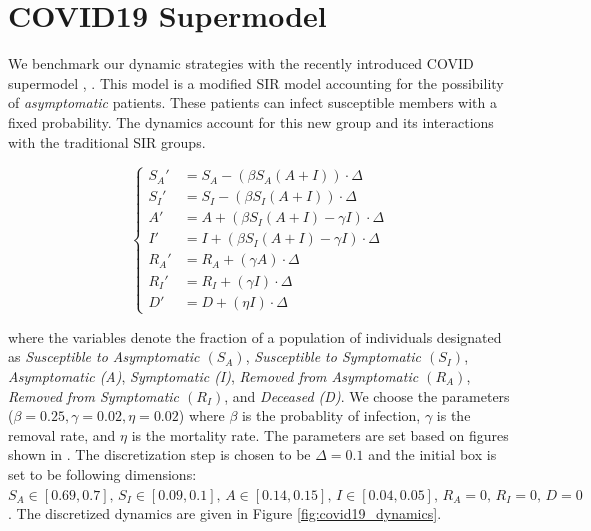 \section{COVID19 Supermodel}
\label{sec:covid}
We benchmark our dynamic strategies with the recently introduced COVID supermodel \cite{ansumali2020modelling}, \cite{indiansuper2020supermodel}. This model is a modified SIR model accounting for the possibility of \emph{asymptomatic} patients. These patients can infect susceptible members with a fixed probability. The dynamics account for this new group and its interactions with the traditional SIR groups.

\begin{center}
\begin{equation*}
  \begin{cases}
   S_A' & = S_A  -(\beta S_A(A+I))\cdot \Delta \\
   S_I' & = S_I  -(\beta S_I (A + I))\cdot \Delta \\
   A' & = A + (\beta S_I(A+I) - \gamma I)\cdot \Delta \\
   I' & = I + (\beta S_I (A+I) - \gamma I)\cdot  \Delta \\
   R_A' & = R_A + (\gamma A)\cdot \Delta \\
   R_I' & = R_I + (\gamma I)\cdot \Delta \\
   D' & = D + (\eta I)\cdot \Delta
  \end{cases}
\end{equation*}
\label{fig:covid19_dynamics}
\end{center}

where the variables denote the fraction of a population of individuals designated as \emph{Susceptible to Asymptomatic $(S_A)$}, \emph{Susceptible to Symptomatic $(S_I)$}, \emph{Asymptomatic (A)}, \emph{Symptomatic (I)}, \emph{Removed from Asymptomatic $(R_A)$}, \emph{Removed from Symptomatic $(R_I)$}, and \emph{Deceased (D)}. We choose the parameters ($\beta = 0.25, \gamma=0.02, \eta=0.02$) where $\beta$ is the probablity of infection, $\gamma$ is the removal rate, and $\eta$ is the mortality rate. The parameters are set based on figures shown in \cite{ansumali2020modelling}. The discretization step is chosen to be $\Delta = 0.1$ and the initial box is set to be following dimensions: $S_A  \in [0.69, 0.7], \, S_I \in [0.09, 0.1], \, A \in [0.14, 0.15], \, I \in [0.04, 0.05], \, R_A  = 0,\, R_I  = 0, \, D  = 0$. The discretized dynamics are given in Figure \ref{fig:covid19_dynamics}.

